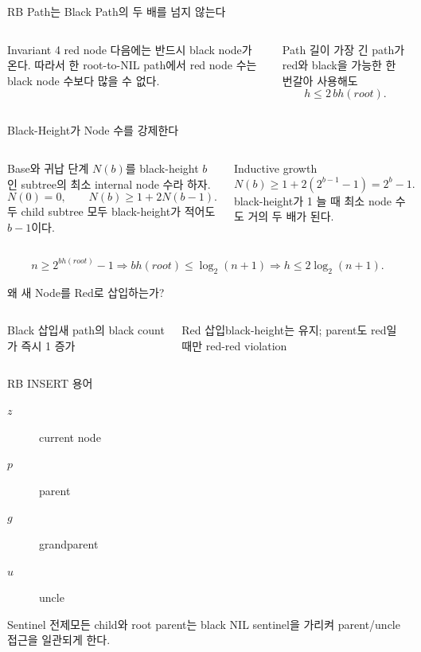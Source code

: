 \begin{frame}{RB Path는 Black Path의 두 배를 넘지 않는다}
\begin{columns}[T]
\begin{block}{Invariant 4}
red node 다음에는 반드시 black node가 온다. 따라서 한 root-to-NIL path에서 red node 수는 black node 수보다 많을 수 없다.
\end{block}
\begin{block}{Path 길이}
가장 긴 path가 red와 black을 가능한 한 번갈아 사용해도
\[
h\le 2\,bh(root).
\]
\end{block}
\end{columns}
\end{frame}
\begin{frame}{Black-Height가 Node 수를 강제한다}
\begin{columns}[T]
\begin{block}{Base와 귀납 단계}
$N(b)$를 black-height $b$인 subtree의 최소 internal node 수라 하자.
\[
N(0)=0,\qquad N(b)\ge 1+2N(b-1).
\]
두 child subtree 모두 black-height가 적어도 $b-1$이다.
\end{block}
\begin{block}{Inductive growth}
\[
N(b)\ge 1+2(2^{b-1}-1)=2^b-1.
\]
black-height가 1 늘 때 최소 node 수도 거의 두 배가 된다.
\end{block}
\end{columns}
\[
n\ge2^{bh(root)}-1
\Rightarrow bh(root)\le\log_2(n+1)
\Rightarrow h\le2\log_2(n+1).
\]
\end{frame}
\begin{frame}{왜 새 Node를 Red로 삽입하는가?}
\begin{columns}[T]\begin{block}{Black 삽입}새 path의 black count가 즉시 1 증가\end{block}
\begin{block}{Red 삽입}black-height는 유지; parent도 red일 때만 red-red violation\end{block}\end{columns}
\end{frame}
\begin{frame}{RB INSERT 용어}
\begin{description}\item[$z$] current node\item[$p$] parent\item[$g$] grandparent\item[$u$] uncle\end{description}
\begin{alertblock}{Sentinel 전제}모든 child와 root parent는 black NIL sentinel을 가리켜 parent/uncle 접근을 일관되게 한다.\end{alertblock}
\end{frame}
